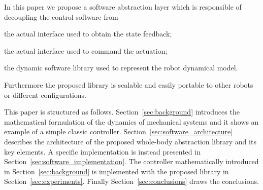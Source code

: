 In this paper we propose a software abstraction layer which is responsible of decoupling the control software from 
\begin{inparaenum}[i)]
    \item the actual interface used to obtain the state feedback;
    \item the actual interface used to command the actuation;
    \item the dynamic software library used to represent the robot dynamical model.
\end{inparaenum}
Furthermore the proposed library is scalable and easily portable to other robots or different configurations.





This paper is structured as follows. Section~\ref{sec:background} introduces the mathematical formulation of the dynamics of mechanical systems and it shows an example of a simple classic controller.
Section~\ref{sec:software_architecture} describes the architecture of the proposed whole-body abstraction library and its key elements.
A specific implementation is instead presented in Section~\ref{sec:software_implementation}.
The controller mathematically introduced in Section~\ref{sec:background} is implemented with the proposed library in Section~\ref{sec:experiments}. 
Finally Section~\ref{sec:conclusions} draws the conclusions.
